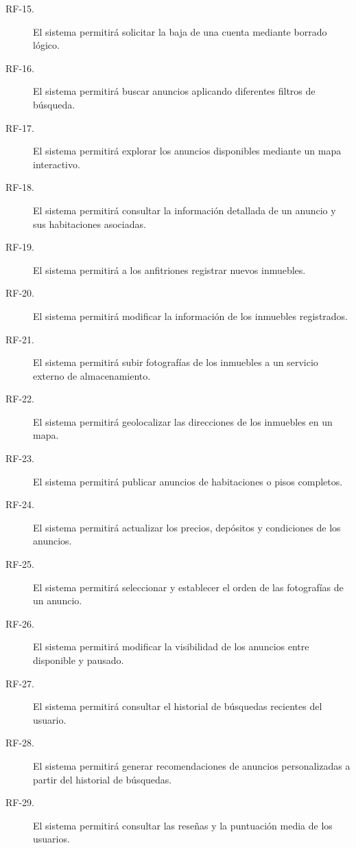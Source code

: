 \begin{description}
    \item[RF-15.] El sistema permitirá solicitar la baja de una cuenta mediante borrado lógico.

    \item[RF-16.] El sistema permitirá buscar anuncios aplicando diferentes filtros de búsqueda.

    \item[RF-17.] El sistema permitirá explorar los anuncios disponibles mediante un mapa interactivo.

    \item[RF-18.] El sistema permitirá consultar la información detallada de un anuncio y sus habitaciones asociadas.

    \item[RF-19.] El sistema permitirá a los anfitriones registrar nuevos inmuebles.

    \item[RF-20.] El sistema permitirá modificar la información de los inmuebles registrados.

    \item[RF-21.] El sistema permitirá subir fotografías de los inmuebles a un servicio externo de almacenamiento.

    \item[RF-22.] El sistema permitirá geolocalizar las direcciones de los inmuebles en un mapa.

    \item[RF-23.] El sistema permitirá publicar anuncios de habitaciones o pisos completos.

    \item[RF-24.] El sistema permitirá actualizar los precios, depósitos y condiciones de los anuncios.

    \item[RF-25.] El sistema permitirá seleccionar y establecer el orden de las fotografías de un anuncio.

    \item[RF-26.] El sistema permitirá modificar la visibilidad de los anuncios entre disponible y pausado.

    \item[RF-27.] El sistema permitirá consultar el historial de búsquedas recientes del usuario.

    \item[RF-28.] El sistema permitirá generar recomendaciones de anuncios personalizadas a partir del historial de búsquedas.

    \item[RF-29.] El sistema permitirá consultar las reseñas y la puntuación media de los usuarios.


\end{description}
